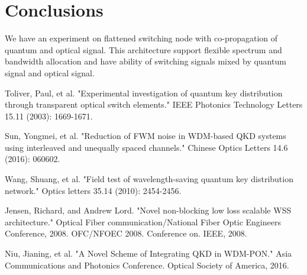 \documentclass[letterpaper,10pt]{article}
\begin{document}
\section{Conclusions}
We have an experiment on flattened switching node with co-propagation of quantum and optical signal. This architecture support flexible spectrum and bandwidth allocation and have ability of switching signals mixed by quantum signal and optical signal.

\begin{thebibliography}{99}

 Toliver, Paul, et al. "Experimental investigation of quantum key distribution through transparent optical switch elements." IEEE Photonics Technology Letters 15.11 (2003): 1669-1671.

 Sun, Yongmei, et al. "Reduction of FWM noise in WDM-based QKD systems using interleaved and unequally spaced channels." Chinese Optics Letters 14.6 (2016): 060602.

 Wang, Shuang, et al. "Field test of wavelength-saving quantum key distribution network." Optics letters 35.14 (2010): 2454-2456.

 Jensen, Richard, and Andrew Lord. "Novel non-blocking low loss scalable WSS architecture." Optical Fiber communication/National Fiber Optic Engineers Conference, 2008. OFC/NFOEC 2008. Conference on. IEEE, 2008.

 Niu, Jianing, et al. "A Novel Scheme of Integrating QKD in WDM-PON." Asia Communications and Photonics Conference. Optical Society of America, 2016.

\end{thebibliography}
\end{document}
